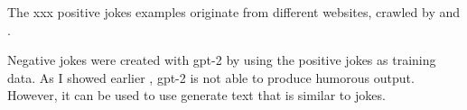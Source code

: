 \documentclass[12pt]{scrartcl}
\begin{document}
The xxx positive jokes examples originate from different websites, crawled by \cite{pungasDatasetEnglishPlaintext2017} and \cite{moudgilPythonScriptsBuilding2017}. 

Negative jokes were created with gpt-2 by using the positive jokes as training data. As I showed earlier \citep{aminComputationalHumorAutomatic2019}, gpt-2 is not able to produce humorous output. However, it can be used to use generate text that is similar to jokes. 

\subsection{}



\end{document}
